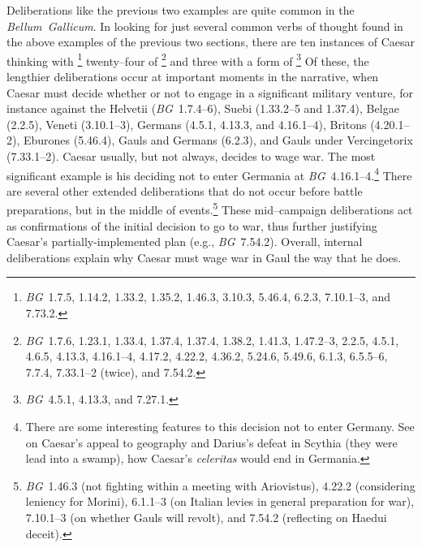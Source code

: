 \documentclass[12pt,letterpaper,oneside,final]{memoir}
\begin{document}
Deliberations like the previous two examples are quite common in the \emph{Bellum~Gallicum}. In looking for just several common verbs of thought found in the above examples of the previous two sections, there are ten instances of Caesar thinking with \footnote{\emph{BG}~1.7.5, 1.14.2, 1.33.2, 1.35.2, 1.46.3, 3.10.3, 5.46.4, 6.2.3, 7.10.1--3, and 7.73.2.} twenty--four of \footnote{\emph{BG}~1.7.6, 1.23.1, 1.33.4, 1.37.4, 1.37.4, 1.38.2, 1.41.3, 1.47.2--3, 2.2.5, 4.5.1, 4.6.5, 4.13.3, 4.16.1--4, 4.17.2, 4.22.2, 4.36.2, 5.24.6, 5.49.6, 6.1.3, 6.5.5--6, 7.7.4, 7.33.1--2 (twice), and 7.54.2.} and three with a form of \footnote{\emph{BG}~4.5.1, 4.13.3, and 7.27.1.} Of these, the lengthier deliberations occur at important moments in the narrative, when Caesar must decide whether or not to engage in a significant military venture, for instance against the Helvetii (\emph{BG}~1.7.4--6), Suebi (1.33.2--5 and 1.37.4), Belgae (2.2.5), Veneti (3.10.1--3), Germans (4.5.1, 4.13.3, and 4.16.1--4), Britons (4.20.1--2), Eburones (5.46.4), Gauls and Germans (6.2.3), and Gauls under Vercingetorix (7.33.1--2). Caesar usually, but not always, decides to wage war. The most significant example is his deciding not to enter Germania at \emph{BG}~4.16.1--4.\footnote{There are some interesting features to this decision not to enter Germany. See \textcite{krebs2006} on Caesar's appeal to geography and Darius's defeat in Scythia (they were lead into a swamp), how Caesar's \emph{celeritas} would end in Germania.} There are several other extended deliberations that do not occur before battle preparations, but in the middle of events.\footnote{\emph{BG}~1.46.3 (not fighting within a meeting with Ariovistus), 4.22.2 (considering leniency for Morini), 6.1.1--3 (on Italian levies in general preparation for war), 7.10.1--3 (on whether Gauls will revolt), and 7.54.2 (reflecting on Haedui deceit).} These mid--campaign deliberations act as confirmations of the initial decision to go to war, thus further justifying Caesar's partially-implemented plan (e.g., \emph{BG}~7.54.2). Overall, internal deliberations explain why Caesar must wage war in Gaul the way that he does.
\end{document}
